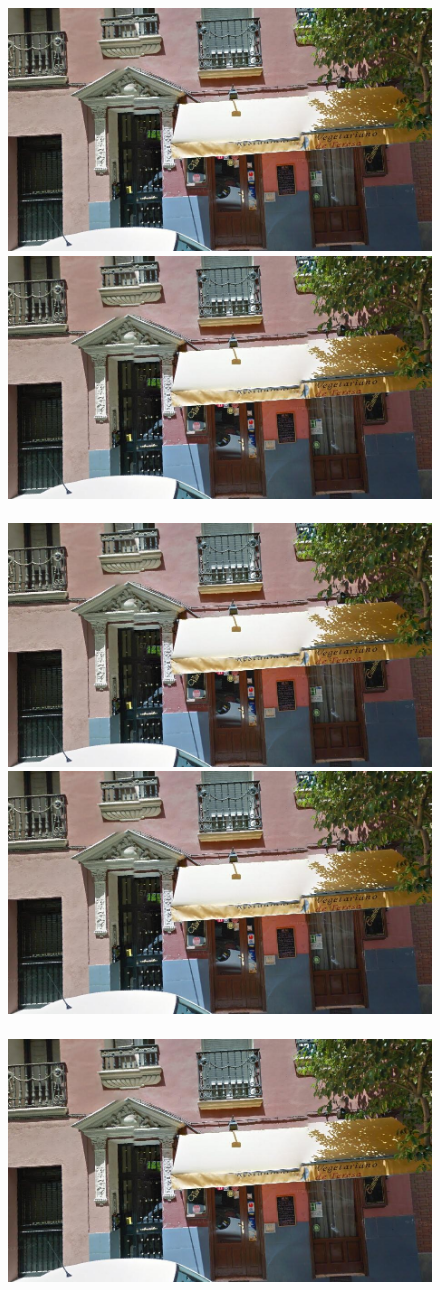\documentclass[runningheads]{llncs}
\begin{document}
\begin{figure}
  \begin{minipage}{\linewidth}
    \begin{minipage}{0.3\linewidth}
      \includegraphics[width=0.49\linewidth]{imgs/cutout_pitch04.jpg}
      \includegraphics[width=0.49\linewidth]{imgs/cutout_pitch04.jpg}
      \\ \vspace{-3mm} \\
      \includegraphics[width=0.49\linewidth]{imgs/cutout_pitch04.jpg}
      \includegraphics[width=0.49\linewidth]{imgs/cutout_pitch04.jpg}
      \\ \vspace{-3mm} \\
      \includegraphics[width=0.49\linewidth]{imgs/cutout_pitch04.jpg}

\end{minipage}
\end{minipage}
\end{figure}
\end{document}
